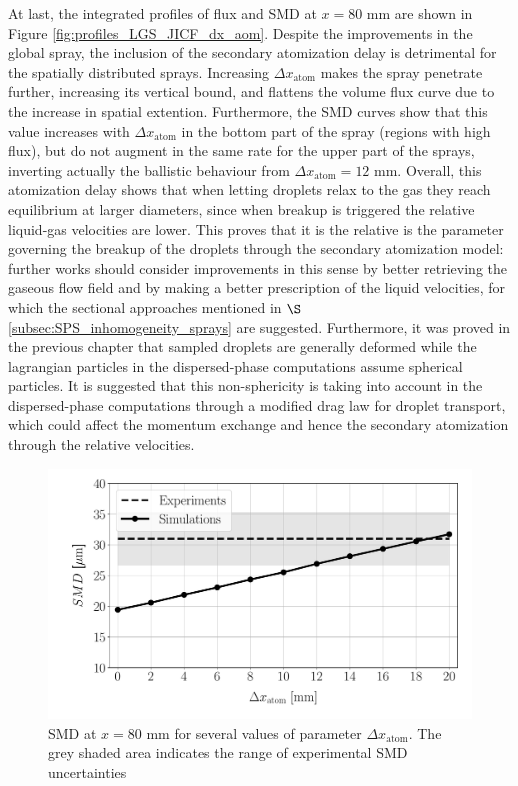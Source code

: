 At last, the integrated profiles of flux and SMD at $x = 80$ mm are shown in Figure \ref{fig:profiles_LGS_JICF_dx_aom}. Despite the improvements in the global spray, the inclusion of the secondary atomization delay is detrimental for the spatially distributed sprays. Increasing $\Delta x_\mathrm{atom}$ makes the spray penetrate further, increasing its vertical bound, and flattens the volume flux curve due to the increase in spatial extention. Furthermore, the SMD curves show that this value increases with $\Delta x_\mathrm{atom}$ in the bottom part of the spray (regions with high flux), but do not augment in the same rate for the upper part of the sprays, inverting actually the ballistic behaviour from $\Delta x_\mathrm{atom} = 12$ mm. Overall, this atomization delay shows that when letting droplets relax to the gas they reach equilibrium at larger diameters, since when breakup is triggered the relative liquid-gas velocities are lower.  This proves that it is the relative is the parameter governing the breakup of the droplets through the secondary atomization model: further works should consider improvements in this sense by better retrieving the gaseous flow field and by making a better prescription of the liquid velocities, for which the sectional approaches mentioned in $\S$\ref{subsec:SPS_inhomogeneity_sprays} are suggested. Furthermore, it was proved in the previous chapter that sampled droplets are generally deformed while the lagrangian particles in the dispersed-phase computations assume spherical particles. It is suggested that this non-sphericity is taking into account in the dispersed-phase computations through a modified drag law for droplet transport, which could affect the momentum exchange and hence the secondary atomization through the relative velocities. 

\begin{figure}[h!]
\centering
\includegraphics[scale=0.5]{./part2_developments/figures_ch6_lagrangian_JICF/params_dx_atom/SMD_vs_dx_atom}
\caption[SMD at $x = 80$ mm for several values of parameter $\Delta x_\mathrm{atom}$]{SMD at $x = 80$ mm for several values of parameter $\Delta x_\mathrm{atom}$. The grey shaded area indicates the range of experimental SMD uncertainties  }
\label{fig:SMD_vs_dx_atom}
\end{figure}

